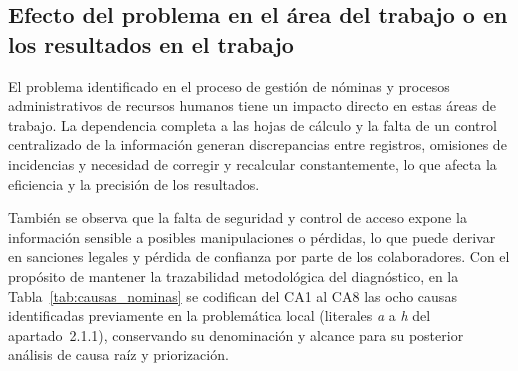 \subsection{Efecto del problema en el área del trabajo o en los resultados en el trabajo}

El problema identificado en el proceso de gestión de nóminas y procesos administrativos de recursos humanos tiene un impacto directo en estas áreas de trabajo. 
La dependencia completa a las hojas de cálculo y la falta de un control centralizado de la información generan discrepancias entre registros, 
omisiones de incidencias y necesidad de corregir y recalcular constantemente, 
lo que afecta la eficiencia y la precisión de los resultados.

También se observa que la falta de seguridad y control de acceso expone la información sensible a posibles manipulaciones o pérdidas, 
lo que puede derivar en sanciones legales y pérdida de confianza por parte de los colaboradores. Con el propósito de mantener 
la trazabilidad metodológica del diagnóstico, en la Tabla~\ref{tab:causas_nominas} 
se codifican del CA1 al CA8 las ocho causas identificadas previamente en la problemática local 
(literales \textit{a} a \textit{h} del apartado~2.1.1), conservando su denominación 
y alcance para su posterior análisis de causa raíz y priorización.

